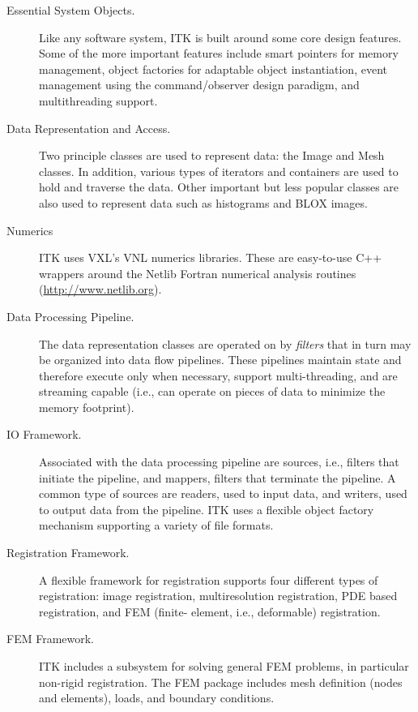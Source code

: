 \begin{description}
	\item[Essential System Objects.] Like any software system, ITK is
        built around some core design features. Some of the more important
        features include smart pointers for memory management, object factories
        for adaptable object instantiation, event management using the 
        command/observer design paradigm, and multithreading support.

	\item[Data Representation and Access.]  Two principle classes are
        used to represent data: the Image and Mesh classes. In addition,
        various types of iterators and containers are used to hold and
        traverse the data. Other important but less popular classes are
        also used to represent data such as histograms and BLOX images.

	\item[Numerics] ITK uses VXL's VNL numerics libraries. These are
        easy-to-use C++ wrappers around the Netlib Fortran numerical 
        analysis routines (\url{http://www.netlib.org}).

	\item[Data Processing Pipeline.]  The data representation classes are
        operated on by \emph{filters} that in turn may be organized into data
        flow pipelines. These pipelines maintain state and therefore execute
        only when necessary, support multi-threading, and are streaming
        capable (i.e., can operate on pieces of data to minimize the
        memory footprint).

        \item[IO Framework.] Associated with the data processing pipeline are
        sources, i.e., filters that initiate the pipeline, and mappers,
        filters that terminate the pipeline. A common type of
        sources are readers, used to input data, and writers, used to
        output data from the pipeline. ITK uses a flexible object factory
        mechanism supporting a variety of file formats.

	\item[Registration Framework.] A flexible framework for registration
        supports four different types of registration: image registration,
        multiresolution registration, PDE based registration, and FEM (finite-
        element, i.e., deformable) registration.

	\item[FEM Framework.] ITK includes a subsystem for solving general
        FEM problems, in particular non-rigid registration. The FEM package
        includes mesh definition (nodes and elements), loads, and boundary
        conditions.


\end{description}
